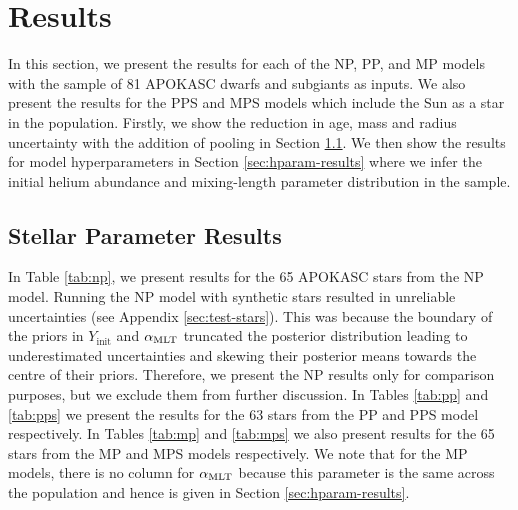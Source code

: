 \section{Results}\label{sec:res}



In this section, we present the results for each of the NP, PP, and MP models with the sample of 81 APOKASC dwarfs and subgiants as inputs. We also present the results for the PPS and MPS models which include the Sun as a star in the population. Firstly, we show the reduction in age, mass and radius uncertainty with the addition of pooling in Section \ref{sec:param-results}. We then show the results for model hyperparameters in Section \ref{sec:hparam-results} where we infer the initial helium abundance and mixing-length parameter distribution in the sample.

\subsection{Stellar Parameter Results}\label{sec:param-results}

In Table \ref{tab:np}, we present results for the 65 APOKASC stars from the NP model. Running the NP model with synthetic stars resulted in unreliable uncertainties (see Appendix \ref{sec:test-stars}). This was because the boundary of the priors in $Y_\mathrm{init}$ and ${\alpha_\mathrm{MLT}}$ truncated the posterior distribution leading to underestimated uncertainties and skewing their posterior means towards the centre of their priors. Therefore, we present the NP results only for comparison purposes, but we exclude them from further discussion. In Tables \ref{tab:pp} and \ref{tab:pps} we present the results for the 63 stars from the PP and PPS model respectively. In Tables \ref{tab:mp} and \ref{tab:mps} we also present results for the 65 stars from the MP and MPS models respectively. We note that for the MP models, there is no column for ${\alpha_\mathrm{MLT}}$ because this parameter is the same across the population and hence is given in Section \ref{sec:hparam-results}.

